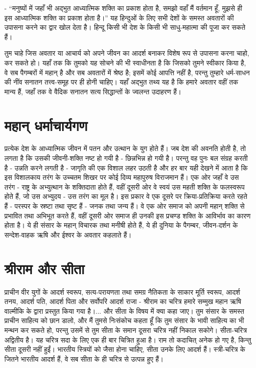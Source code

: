 - “मनुष्यों में जहाँ भी अद्भुत आध्यात्मिक शक्ति का प्रकाश होता है, समझो वहाँ मैं वर्तमान हूँ, मुझसे ही इस आध्यात्मिक शक्ति का प्रकाश होता है।” यह हिन्दुओं के लिए सभी देशों के समस्त अवतारों की उपासना करने का द्वार खोल देता है। हिन्दू किसी भी देश के किसी भी साधु-महात्मा की पूजा कर सकते हैं। 

तुम चाहे जिस अवतार या आचार्य को अपने जीवन का आदर्श बनाकर विशेष रूप से उपासना करना चाहो, कर सकते हो। यहाँ तक कि तुमको यह सोचने की भी स्वाधीनता है कि जिसको तुमने स्वीकार किया है, वे सब पैगम्बरों में महान् है और सब अवतारों में श्रेष्ठ है; इसमें कोई आपत्ति नहीं है, परन्तु तुम्हारे धर्म-साधन की नींव सनातन तत्त्व-समूह पर ही होनी चाहिए। यहाँ अद्भुत तथ्य यह है कि हमारे अवतार वहीं तक मान्य हैं, जहाँ तक वे वैदिक सनातन सत्य सिद्धान्तों के ज्वलन्त उदाहरण हैं।


\section*{महान् धर्माचार्यगण}

\vskip -4pt

प्रत्येक देश के आध्यात्मिक जीवन में पतन और उत्थान के युग होते हैं। जब देश की अवनति होती है, तो लगता है कि उसकी जीवनी-शक्ति नष्ट हो गयी है - छिन्नभिन्न हो गयी है। परन्तु वह पुनः बल संग्रह करती है - उन्नति करने लगती है - जागृति की एक विशाल लहर उठती है और हर बार यही देखने में आता है कि इस विशालकाय तरंग के उच्चतम शिखर पर कोई दिव्य महापुरुष विराजमान हैं। एक ओर जहाँ वे उस तरंग - राष्ट्र के अभ्युत्थान के शक्तिदाता होते हैं, वहीं दूसरी ओर वे स्वयं उस महती शक्ति के फलस्वरूप होते हैं, जो उस अभ्युदय - उस तरंग का मूल है। इस प्रकार वे एक दूसरे पर क्रिया-प्रतिक्रिया करते रहते हैं - परस्पर के स्रष्टा तथा सृष्ट हैं - जनक तथा जन्य हैं। वे एक ओर समाज को अपनी महान् शक्ति से प्रभावित तथा अभिभूत करते हैं, वहीं दूसरी ओर समाज ही उनकी इस प्रचण्ड शक्ति के आविर्भाव का कारण होता है। ये ही संसार के महान् विचारक तथा मनीषी होते हैं, ये ही दुनिया के पैगम्बर, जीवन-दर्शन के सन्देश-वाहक ऋषि और ईश्वर के अवतार कहलाते हैं।


\section*{श्रीराम और सीता}

\vskip -4pt

प्राचीन वीर युगों के आदर्श स्वरूप, सत्य-परायणता तथा समग्र नैतिकता के साकार मूर्ति स्वरूप, आदर्श तनय, आदर्श पति, आदर्श पिता और सर्वोपरि आदर्श राजा - श्रीराम का चरित्र हमारे सम्मुख महान ऋषि वाल्मीकि के द्वारा प्रस्तुत किया गया है।... और सीता के विषय में क्या कहा जाए। तुम संसार के समस्त प्राचीन साहित्य को छान डालो, और मैं तुमसे निःसंकोच कहता हूँ कि तुम संसार के भावी साहित्य का भी मन्थन कर सकते हो, परन्तु उसमें से तुम सीता के समान दूसरा चरित्र नहीं निकाल सकोगे। सीता-चरित्र अद्वितीय है। यह चरित्र सदा के लिए एक ही बार चित्रित हुआ है। राम तो कदाचित् अनेक हो गए है, किन्तु सीता दूसरी नहीं हुईं। भारतीय स्त्रियों को जैसा होना चाहिए, सीता उनके लिए आदर्श हैं। स्त्री-चरित्र के जितने भारतीय आदर्श हैं, वे सब सीता के ही चरित्र से उत्पन्न हुए हैं। 

